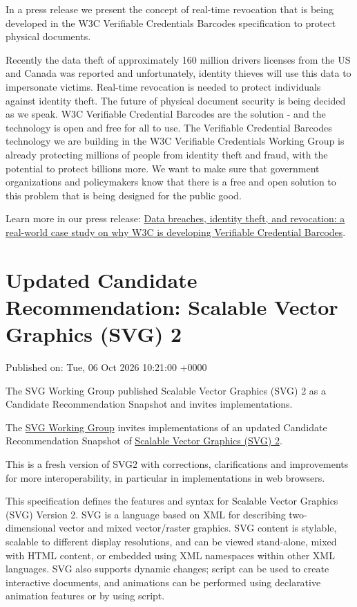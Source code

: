 \documentclass[11pt,a4paper]{article}
\begin{document}
In a press release we present the concept of real-time revocation that is being developed in the W3C Verifiable Credentials Barcodes specification to protect physical documents.

Recently the data theft of approximately 160 million drivers licenses from the US and Canada was reported and unfortunately, identity thieves will use this data to impersonate victims. Real-time revocation is needed to protect individuals against identity theft. The future of physical document security is being decided as we speak. W3C Verifiable Credential Barcodes are the solution - and the technology is open and free for all to use. The Verifiable Credential Barcodes technology we are building in the W3C Verifiable Credentials Working Group is already protecting millions of people from identity theft and fraud, with the potential to protect billions more. We want to make sure that government organizations and policymakers know that there is a free and open solution to this problem that is being designed for the public good.

Learn more in our press release: \href{https://www.w3.org/press-releases/2026/data-breaches-identity-theft-and-revocation-a-real-world-case-study-on-why-w3c-is-developing-verifiable-credential-barcodes/}{Data breaches, identity theft, and revocation: a real-world case study on why W3C is developing Verifiable Credential Barcodes}.

\section{Updated Candidate Recommendation: Scalable Vector Graphics (SVG) 2}

Published on: Tue, 06 Oct 2026 10:21:00 +0000

The SVG Working Group published Scalable Vector Graphics (SVG) 2 as a Candidate Recommendation Snapshot and invites implementations.

The \href{https://www.w3.org/groups/wg/svg/}{SVG Working Group} invites implementations of an updated Candidate Recommendation Snapshot of \href{https://www.w3.org/TR/2026/CR-SVG2-20261006/}{Scalable Vector Graphics (SVG) 2}.

This is a fresh version of SVG2 with corrections, clarifications and improvements for more interoperability, in particular in implementations in web browsers.

This specification defines the features and syntax for Scalable Vector Graphics (SVG) Version 2. SVG is a language based on XML for describing two-dimensional vector and mixed vector/raster graphics. SVG content is stylable, scalable to different display resolutions, and can be viewed stand-alone, mixed with HTML content, or embedded using XML namespaces within other XML languages. SVG also supports dynamic changes; script can be used to create interactive documents, and animations can be performed using declarative animation features or by using script.
\end{document}
